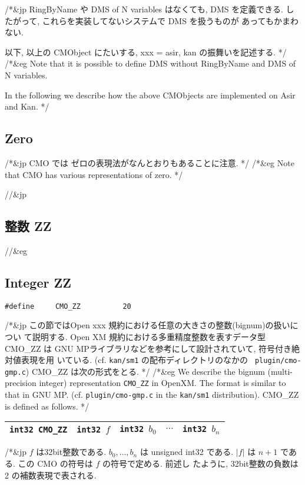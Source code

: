 /*&jp
RingByName や DMS of N variables はなくても, DMS を定義できる.
したがって, これらを実装してないシステムで DMS を扱うものが
あってもかまわない.

以下, 以上の CMObject  にたいする,
xxx = asir, kan の振舞いを記述する.
*/
/*&eg
Note that it is possible to define DMS without RingByName and 
DMS of N variables.

In the following we describe how the above CMObjects 
are implemented on Asir and Kan.
*/

\subsection{ Zero}
/*&jp
CMO では ゼロの表現法がなんとおりもあることに注意.
*/
/*&eg
Note that CMO has various representations of zero.
*/


//&jp \subsection{ 整数 ZZ }
//&eg \subsection{ Integer ZZ }

\begin{verbatim}
#define     CMO_ZZ          20 
\end{verbatim}

/*&jp
この節ではOpen xxx 規約における任意の大きさの整数(bignum)の扱いについ
て説明する.  Open XM 規約における多重精度整数を表すデータ型 CMO\_ZZ は 
GNU MPライブラリなどを参考にして設計されていて, 符号付き絶対値表現を用
いている.  (cf. {\tt kan/sm1} の配布ディレクトリのなかの {\tt
plugin/cmo-gmp.c}) CMO\_ZZ は次の形式をとる.
*/
/*&eg
We describe the bignum (multi-precision integer) representation 
{\tt CMO\_ZZ} in OpenXM.
The format is similar
to that in GNU MP. (cf. {\tt plugin/cmo-gmp.c} in the {\tt kan/sm1} 
distribution). CMO\_ZZ is defined as follows.
*/

\begin{tabular}{|c|c|c|c|c|}
\hline
{\tt int32 CMO\_ZZ} & {\tt int32 $f$} & {\tt int32 $b_0$} & $\cdots$ &
{\tt int32 $b_{n}$} \\
\hline
\end{tabular}

/*&jp
$f$ は32bit整数である.  $b_0, \ldots, b_n$ は unsigned int32 である.
$|f|$ は $n+1$ である.  この CMO の符号は $f$ の符号で定める.  前述し
たように, 32bit整数の負数は 2 の補数表現で表される.

